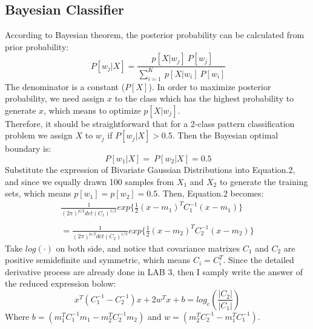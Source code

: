 \documentclass[journal,twocolumn,letterpaper,12pt]{article}
\begin{document}
\subsection{Bayesian Classifier}
According to Bayesian theorem, the posterior probability can be calculated from prior probability:
\begin{equation}
  ~P[w_j|X] = \frac{~p[X|w_j]~P[w_j]}{\sum_{i=1}^K~p[X|w_i]~P[w_i]}
\end{equation}
The denominator is a constant ($P[X]$). In order to maximize posterior probability, we need assign $x$ to the class which has the highest probability to generate $x$, which means to optimize $p[X|w_j]$.\\
Therefore, it should be straightforward that for a 2-class pattern classification problem we assign $X$ to $w_j$ if $P[w_j|X]>0.5$. Then the Bayesian optimal boundary is:
\begin{equation}
  ~P[w_1|X] = ~P[w_2|X] = 0.5
\end{equation}
Substitute the expression of Bivariate Gaussian Distributions into Equation.2, and since we equally drawn 100 samples from $X_1$ and $X_2$ to generate the training sets, which means $p[w_1]=p[w_2]=0.5$. Then, Equation.2 becomes:
\begin{displaymath}
  \begin{array}{c}
    \frac{1}{(2\pi)^{p/2}det(C_1)^{1/2}}exp{\{\frac{1}{2}(x-m_1)^TC_1^{-1}(x-m_1)}\} \\
    \quad \\
    =\frac{1}{(2\pi)^{p/2}det(C_2)^{1/2}}exp{\{\frac{1}{2}(x-m_2)^TC_2^{-1}(x-m_2)}\}
  \end{array}
\end{displaymath}
Take $log(\cdot)$ on both side, and notice that covariance matrixes $C_1$ and $C_2$ are positive semidefinite and symmetric, which means $C_i = C_i^{T}$. Since the detailed derivative process are already done in LAB 3, then I samply write the answer of the reduced expression bolow:
\begin{equation}
  x^T(C_1^{-1}-C_2^{-1})x + 2w^Tx + b = log_e(\frac{|C_2|}{|C_1|})
\end{equation}
Where $b = (m_1^TC_1^{-1}m_1 - m_2^TC_2^{-1}m_2)$ and $w=(m_2^TC_2^{-1}-m_1^TC_1^{-1})$.\\
\end{document}
